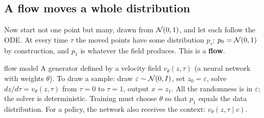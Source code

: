 \subsection{A flow moves a whole distribution}
Now start not one point but many, drawn from $\mathcal{N}(0,1)$, and let each follow the ODE. At every time $\tau$ the moved points have some distribution $p_\tau$: $p_0=\mathcal{N}(0,1)$ by construction, and $p_1$ is whatever the field produces. This is a \textbf{flow}.
\begin{newc}{flow model}
A generator defined by a velocity field $v_\theta(z,\tau)$ (a neural network with weights $\theta$). To draw a sample: draw $\varepsilon\sim\mathcal{N}(0,I)$, set $z_0=\varepsilon$, solve $dz/d\tau=v_\theta(z,\tau)$ from $\tau=0$ to $\tau=1$, output $x=z_1$. All the randomness is in $\varepsilon$; the solver is deterministic. Training must choose $\theta$ so that $p_1$ equals the data distribution. For a policy, the network also receives the context: $v_\theta(z,\tau\mid c)$.
\end{newc}

